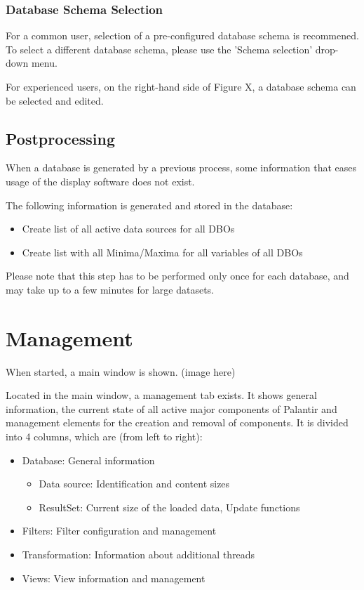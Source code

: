 \documentclass[10pt,letterpaper,extrafontsizes]{memoir}
\begin{document}
\subsubsection{Database Schema Selection}
For a common user, selection of a pre-configured database schema is recommened. To select a different database schema, please use the 'Schema selection' drop-down menu.

For experienced users, on the right-hand side of Figure X, a database schema can be selected and edited.

\subsection{Postprocessing}
When a database is generated by a previous process,  some information that eases usage of the display software does not exist. 

The following information is generated and stored in the database:

\begin{itemize}  
\item Create list of all active data sources for all DBOs
\item Create list with all Minima/Maxima for all variables of all DBOs
\end{itemize}

Please note that this step has to be performed only once for each database, and may take up to a few minutes for large datasets.

\section{Management}
\label{sec:management}

When started, a main window is shown.
(image here)

Located in the main window, a management tab exists.  It shows general information, the current state
of  all  active  major  components  of  Palantir  and  management  elements  for  the  creation  and  removal  of
components. It is divided into 4 columns, which are (from left to right):

\begin{itemize}  
\item Database: General information
\begin{itemize}  
\item Data source: Identification and content sizes
\item ResultSet: Current size of the loaded data, Update functions
\end{itemize}
\item Filters: Filter configuration and management
\item Transformation: Information about additional threads
\item Views: View information and management
\end{itemize}
\end{document}
